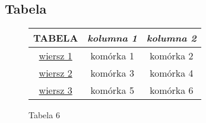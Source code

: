 \subsection{Tabela}
\begin{figure} [h]
\begin{center}
\begin{tabular}{ |c|c|c| } 
 \hline
 \textbf{TABELA} & \textit{kolumna 1} & \textit{kolumna 2} \\ 
 \hline
 \underline{wiersz 1} & komórka 1 & komórka 2 \\ 
 \hline
 \underline{wiersz 2}  & komórka 3 & komórka 4 \\ 
 \hline
 \underline{wiersz 3}  & komórka 5 & komórka 6 \\ 
 \hline
\end{tabular}
\end{center}
\caption{Tabela 6}
\label{fig:table6}
\end{figure}